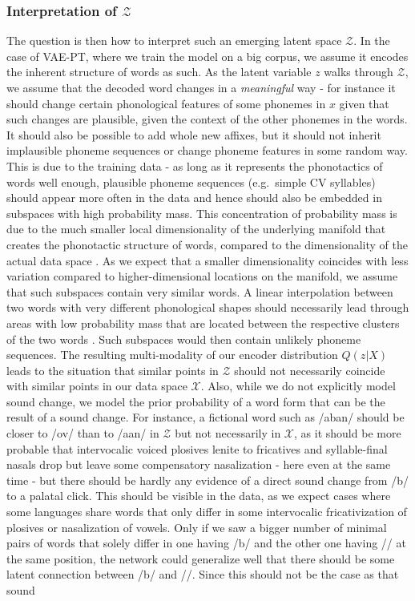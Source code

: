 \documentclass[6pt]{article}
\begin{document}
\subsubsection{Interpretation of $\mathcal{Z}$}
\label{interpretation_of_z}
The question is then how to interpret such an emerging latent space $\mathcal{Z}$. In the case of VAE-PT, where we train the model on a big corpus, we assume it encodes the inherent structure of words as such. As the latent variable $z$ walks through $\mathcal{Z}$, we assume that the decoded word changes in a \textit{meaningful} way - for instance it should change certain phonological features of some phonemes in $x$ given that such changes are plausible, given the context of the other phonemes in the words. It should also be possible to add whole new affixes, but it should not inherit implausible phoneme sequences or change phoneme features in some random way. This is due to the training data - as long as it represents the phonotactics of words well enough, plausible phoneme sequences (e.g.\ simple CV syllables) should appear more often in the data and hence should also be embedded in subspaces with high probability mass. This concentration of probability mass is due to the much smaller local dimensionality of the underlying manifold that creates the phonotactic structure of words, compared to the dimensionality of the actual data space \citep[p. 3]{bengio2013representation}. As we expect that a smaller dimensionality coincides with less variation compared to higher-dimensional locations on the manifold, we assume that such subspaces contain very similar words. A linear interpolation between two words with very different phonological shapes should necessarily lead through areas with low probability mass that are located between the respective clusters of the two words \citep[p. 3]{bengio2013representation}. Such subspaces would then contain unlikely phoneme sequences. The resulting multi-modality of our encoder distribution $Q(z|X)$ leads to the situation that similar points in $\mathcal{Z}$ should not necessarily coincide with similar points in our data space $\mathcal{X}$. Also, while we do not explicitly model sound change, we model the prior probability of a word form that can be the result of a sound change. For instance, a fictional word such as /aban/ should be closer to /ov/ than to /a\textipa{\textdoublebarpipe}an/ in $\mathcal{Z}$ but not necessarily in $\mathcal{X}$, as it should be more probable that intervocalic voiced plosives lenite to fricatives and syllable-final nasals drop but leave some compensatory nasalization - here even at the same time - but there should be hardly any evidence of a direct sound change from /b/ to a palatal click. This should be visible in the data, as we expect cases where some languages share words that only differ in some intervocalic fricativization of plosives or nasalization of vowels. Only if we saw a bigger number of minimal pairs of words that solely differ in one having /b/ and the other one having /\textipa{\textdoublebarpipe}/ at the same position, the network could generalize well that there should be some latent connection between /b/ and /\textipa{\textdoublebarpipe}/. Since this should not be the case as that sound 
\end{document}
